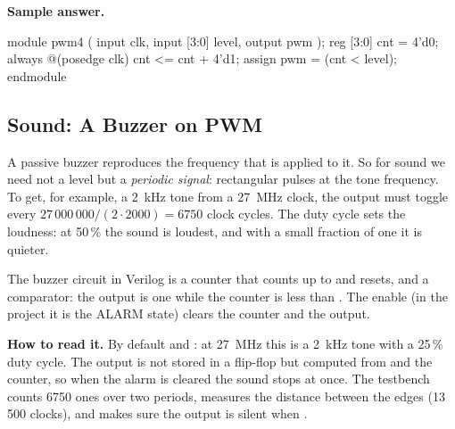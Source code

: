 \textbf{Sample answer.}
\begin{vcode}
module pwm4 (
    input        clk,
    input  [3:0] level,
    output       pwm
);
    reg [3:0] cnt = 4'd0;
    always @(posedge clk) cnt <= cnt + 4'd1;
    assign pwm = (cnt < level);
endmodule
\end{vcode}


\subsection{Sound: A Buzzer on PWM}

A passive buzzer reproduces the frequency that is applied to it. So for
sound we need not a level but a \emph{periodic signal}: rectangular
pulses at the tone frequency. To get, for example, a 2~kHz tone from a 27~MHz
clock, the output must toggle every $27\,000\,000/(2\cdot 2000)
= 6750$ clock cycles. The duty cycle sets the loudness: at 50\,\% the sound is loudest, and with a
small fraction of one it is quieter.

The buzzer circuit in Verilog is a counter that counts up to  and
resets, and a comparator: the output is one while the counter is less than
. The enable  (in the project it is the ALARM state) clears
the counter and the output.


\textbf{How to read it.} By default  and :
at 27~MHz this is a 2~kHz tone with a 25\,\% duty cycle. The output  is
not stored in a flip-flop but computed from  and the counter, so when the
alarm is cleared the sound stops at once. The testbench  counts
6750 ones over two periods, measures the distance between the edges (13\,500
clocks), and makes sure the output is silent when .

